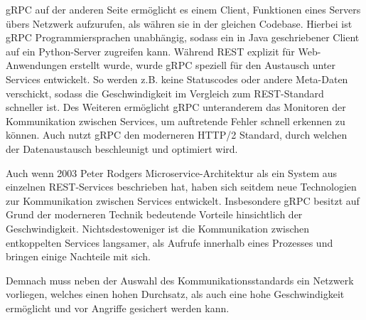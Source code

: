 gRPC auf der anderen Seite ermöglicht es einem Client, Funktionen eines Servers übers Netzwerk aufzurufen, als währen sie in der gleichen Codebase. Hierbei ist gRPC Programmiersprachen unabhängig, sodass ein in Java geschriebener Client auf ein Python-Server zugreifen kann. Während REST explizit für Web-Anwendungen erstellt wurde, wurde gRPC speziell für den Austausch unter Services entwickelt. So werden z.B. keine Statuscodes oder andere Meta-Daten verschickt, sodass die Geschwindigkeit im Vergleich zum REST-Standard schneller ist. Des Weiteren ermöglicht gRPC unteranderem das Monitoren der Kommunikation zwischen Services, um auftretende Fehler schnell erkennen zu können. Auch nutzt gRPC den moderneren HTTP/2 Standard, durch welchen der Datenaustausch beschleunigt und optimiert wird.

Auch wenn 2003 Peter Rodgers Microservice-Architektur als ein System aus einzelnen REST-Services beschrieben hat, haben sich seitdem neue Technologien zur Kommunikation zwischen Services entwickelt. Insbesondere gRPC besitzt auf Grund der moderneren Technik bedeutende Vorteile hinsichtlich der Geschwindigkeit. Nichtsdestoweniger ist die Kommunikation zwischen entkoppelten Services langsamer, als Aufrufe innerhalb eines Prozesses und bringen einige Nachteile mit sich.

Demnach muss neben der Auswahl des Kommunikationsstandards ein Netzwerk vorliegen, welches einen hohen Durchsatz, als auch eine hohe Geschwindigkeit ermöglicht und vor Angriffe gesichert werden kann.

